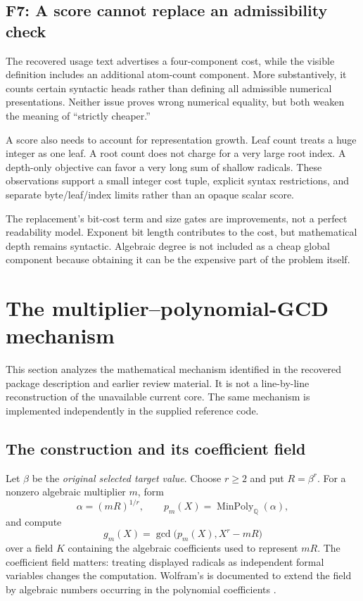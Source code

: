 \documentclass[11pt,letterpaper]{article}
\numberwithin{equation}{section}
\theoremstyle{definition}\newtheorem{definition}[theorem]{Definition}
\theoremstyle{remark}\newtheorem{remark}[theorem]{Remark}
\newcommand{\Q}{\mathbb Q}\newcommand{\C}{\mathbb C}\newcommand{\R}{\mathbb R}\newcommand{\Z}{\mathbb Z}
\newcommand{\code}[1]{\texttt{\detokenize{#1}}}
\newcommand{\finding}[2]{\subsection{#1: #2}}
\begin{document}
\finding{F7}{A score cannot replace an admissibility check}
The recovered usage text advertises a four-component cost, while the visible definition includes an additional atom-count component. More substantively, it counts certain syntactic heads rather than defining all admissible numerical presentations. Neither issue proves wrong numerical equality, but both weaken the meaning of ``strictly cheaper.''

A score also needs to account for representation growth. Leaf count treats a huge integer as one leaf. A root count does not charge for a very large root index. A depth-only objective can favor a very long sum of shallow radicals. These observations support a small integer cost tuple, explicit syntax restrictions, and separate byte/leaf/index limits rather than an opaque scalar score.

The replacement's bit-cost term and size gates are improvements, not a perfect readability model. Exponent bit length contributes to the cost, but mathematical depth remains syntactic. Algebraic degree is not included as a cheap global component because obtaining it can be the expensive part of the problem itself.

\section{The multiplier--polynomial-GCD mechanism}
\label{sec:gcd}
This section analyzes the mathematical mechanism identified in the recovered package description and earlier review material. It is not a line-by-line reconstruction of the unavailable current core. The same mechanism is implemented independently in the supplied reference code.

\subsection{The construction and its coefficient field}
Let $\beta$ be the \emph{original selected target value}. Choose $r\ge2$ and put $R=\beta^r$. For a nonzero algebraic multiplier $m$, form
\[
 \alpha=(mR)^{1/r},\qquad p_m(X)=\operatorname{MinPoly}_{\Q}(\alpha),
\]
and compute
\begin{equation}\label{eq:gcd}
 g_m(X)=\gcd\bigl(p_m(X),X^r-mR\bigr)
\end{equation}
over a field $K$ containing the algebraic coefficients used to represent $mR$. The coefficient field matters: treating displayed radicals as independent formal variables changes the computation. Wolfram's \code{Extension -> Automatic} is documented to extend the field by algebraic numbers occurring in the polynomial coefficients \cite{wl-gcd}.
\end{document}
